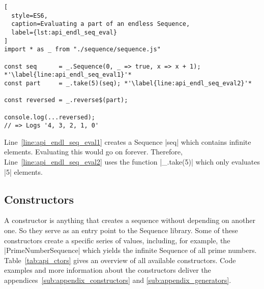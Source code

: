 \begin{lstlisting}[
  style=ES6,
  caption=Evaluating a part of an endless Sequence,
  label={lst:api_endl_seq_eval}
]
import * as _ from "./sequence/sequence.js"

const seq      = _.Sequence(0, _ => true, x => x + 1); *'\label{line:api_endl_seq_eval1}'*
const part     = _.take(5)(seq); *'\label{line:api_endl_seq_eval2}'*

const reversed = _.reverse$(part);

console.log(...reversed);
// => Logs '4, 3, 2, 1, 0'
\end{lstlisting}

Line~\ref{line:api_endl_seq_eval1} creates a Sequence |seq| which contains
infinite elements. Evaluating this would go on forever. Therefore,
Line~\ref{line:api_endl_seq_eval2} uses the function |_.take(5)| which only
evaluates |5| elements.

\subsection{Constructors} %
\label{sub:api_Constructors}
A constructor is anything that creates a sequence without depending on another
one. So they serve as an entry point to the Sequence library. Some of these
constructors create a specific series of values, including, for example, the
|PrimeNumberSequence| which yields the infinite Sequence of all prime
numbers.\\
Table~\ref{tab:api_ctors} gives an overview of all available constructors. Code
examples and more information about the constructors deliver the
appendices~\ref{sub:appendix_constructors} and
\ref{sub:appendix_generators}.

